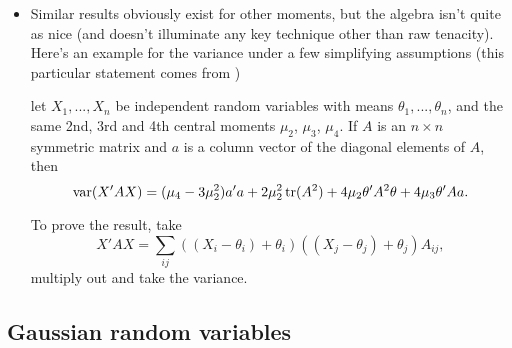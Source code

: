 \begin{itemize}[leftmargin=0pt]
\item Similar results obviously exist for other moments, but the
  algebra isn't quite as nice (and doesn't illuminate any key
  technique other than raw tenacity).  Here's an example for the
  variance under a few simplifying assumptions (this particular
  statement comes from \citealp{SL03})
  \begin{thm}
    let $X_1,...,X_n$ be independent random variables with means
    $\theta_1,...,\theta_n$, and the same 2nd, 3rd and 4th central
    moments $\mu_2$, $\mu_3$, $\mu_4$.  If $A$ is an $n \times n$
    symmetric matrix and $a$ is a column vector of the diagonal
    elements of $A$, then
    \begin{equation*}
      \operatorname{var}(X'AX) = 
      (\mu_4 - 3 \mu_2^2)a'a + 2 \mu_2^2 \operatorname{tr}(A^2) + 4 \mu_2 \theta'A^2 \theta + 4 \mu_3 \theta' A a.
    \end{equation*}
  \end{thm}
  To prove the result, take
  \begin{equation*}
    X'A X = \sum_{ij} ((X_i - \theta_i) + \theta_i) ((X_j - \theta_j) + \theta_j) A_{ij},
  \end{equation*}
  multiply out and take the variance.

\end{itemize}

\subsection{Gaussian random variables}

